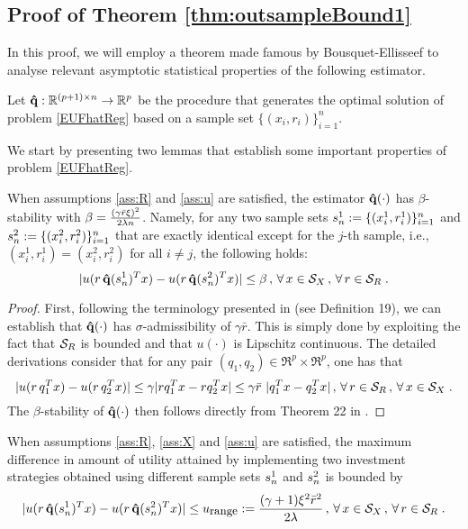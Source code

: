 \subsection{Proof of Theorem \ref{thm:outsampleBound1}}\label{sec:thm1_proof}

In this proof, we will employ a theorem made famous by Bousquet-Ellisseef to analyse
relevant asymptotic statistical properties of the following estimator.
\begin{definition}
  Let ${\bold{{\hat{q}}}}:\mathbb{R}^{(p+1)\times n}\rightarrow \mathbb{R}^p$ be the procedure that generates the
  optimal solution of problem \eqref{EUFhatReg} based on a sample set
  $\{(x_i,r_i)\}_{i=1}^n$.
\end{definition}

We start by presenting two lemmas that establish some important properties of problem
\eqref{EUFhatReg}.
\begin{lemma}\label{beta-bound}
  When assumptions \ref{ass:R} and \ref{ass:u} are satisfied, the estimator
  $\bold{{\hat{q}}}(\cdot)$ has $\beta$-stability with
  $ \beta = \frac{(\gamma\bar r\xi)^2}{2\lambda n}$. Namely, for any two sample sets
  $s_n^1:=\{(x_i^1,r_i^1)\}_{i=1}^n$ and $s_n^2:=\{(x_i^2,r_i^2)\}_{i=1}^n$ that are
  exactly identical except for the $j$-th sample, i.e., $(x_i^1,r_i^1)=(x_i^2,r_i^2)$ for
  all $i\neq j$, the following holds:
  \[
    |u(r\,{\bold{{\hat{q}}}}(s_n^1)^T x) - u(r\,{\bold{{\hat{q}}}}(s_n^2)^T x)| \leq \beta\,,\,\forall\,x\in{\mathcal{S}_X}\,,\,\forall\,r\in{\mathcal{S}_R}\;.
  \]
\end{lemma}

\begin{proof}
  First, following the terminology presented in \cite{bousquet2002stability} (see
  Definition 19), we can establish that ${\bold{{\hat{q}}}}(\cdot)$ has $\sigma$-admissibility of
  $\gamma\bar{r}$. This is simply done by exploiting the fact that ${\mathcal{S}_R}$ is bounded and
  that $u(\cdot)$ is Lipschitz continuous. The detailed derivations consider that for any
  pair $(q_1,q_2)\in\Re^p\times\Re^p$, one has that
  \[ 
    |u(r\,q_1^T x) - u(r\,q_2^T x)| \leq \gamma |rq_1^Tx - rq_2^Tx|\leq \gamma\bar{r}\
    |q_1^Tx - q_2^Tx| \,,\,\forall\,r\in{\mathcal{S}_R}\,,\,\forall\,x\in{\mathcal{S}_X}\;.
  \]
  The $\beta$-stability of $\bold{{\hat{q}}}(\cdot)$ then follows directly from Theorem 22 in
  \cite{bousquet2002stability}.
\end{proof}

\begin{lemma}\label{u-bound}
  When assumptions \ref{ass:R}, \ref{ass:X} and \ref{ass:u} are satisfied, the maximum
  difference in amount of utility attained by implementing two investment strategies
  obtained using different sample sets $s_n^1$ and $s_n^2$ is bounded by
  \[
    |u(r\,\qhatOp(\Sn^1)^T x)-u(r\,\qhatOp(\Sn^2)^T x)| \leq \urange :=
    \frac{(\gamma+1)\xi^2
      \bar{r}^2}{2\lambda}\,,\,\forall\,x\in\Sx\,,\,\forall\,r\in\Sr\;.
  \]
\end{lemma}

